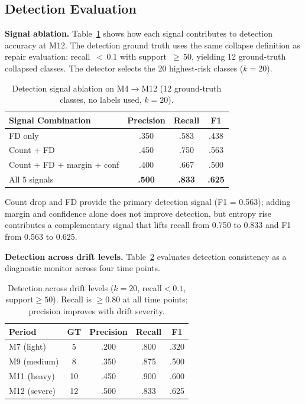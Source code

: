 \documentclass[journal]{IEEEtran}
\begin{document}
\subsection{Detection Evaluation}
\label{sec:detection_eval}

\textbf{Signal ablation.}
Table~\ref{tab:detect_signals} shows how each signal contributes to detection accuracy at M12.
The detection ground truth uses the same collapse definition as repair evaluation: recall~${<}\,0.1$ with support~${\geq}\,50$, yielding 12 ground-truth collapsed classes.
The detector selects the 20 highest-risk classes ($k{=}20$).

\begin{table}[t]
\centering
\caption{Detection signal ablation on M4$\to$M12 (12 ground-truth classes, no labels used, $k{=}20$).}
\label{tab:detect_signals}
\small
\begin{tabular}{@{}l ccc@{}}
\toprule
Signal Combination & Precision & Recall & F1 \\
\midrule
FD only & .350 & .583 & .438 \\
Count + FD & .450 & .750 & .563 \\
Count + FD + margin + conf & .400 & .667 & .500 \\
All 5 signals & \textbf{.500} & \textbf{.833} & \textbf{.625} \\
\bottomrule
\end{tabular}
\end{table}

Count drop and FD provide the primary detection signal (F1 = 0.563); adding margin and confidence alone does not improve detection, but entropy rise contributes a complementary signal that lifts recall from 0.750 to 0.833 and F1 from 0.563 to 0.625.

\textbf{Detection across drift levels.}
Table~\ref{tab:trigger} evaluates detection consistency as a diagnostic monitor across four time points.

\begin{table}[t]
\centering
\caption{Detection across drift levels ($k{=}20$, recall${<}0.1$, support${\geq}50$). Recall is $\geq$0.80 at all time points; precision improves with drift severity.}
\label{tab:trigger}
\small
\begin{tabular}{@{}l cccc@{}}
\toprule
Period & GT & Precision & Recall & F1 \\
\midrule
M7 (light)   & 5  & .200 & .800 & .320 \\
M9 (medium)  & 8  & .350 & .875 & .500 \\
M11 (heavy)  & 10 & .450 & .900 & .600 \\
M12 (severe) & 12 & .500 & .833 & .625 \\
\bottomrule
\end{tabular}
\end{table}
\end{document}
